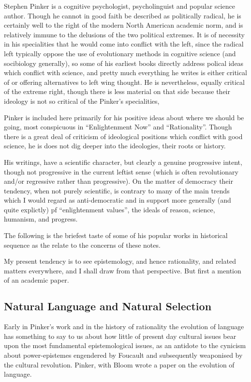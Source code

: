 \documentclass[10pt,titlepage]{book}
\begin{document}
Stephen Pinker is a cognitive psychologist, psycholinguist and popular science author.
Though he cannot in good faith be described as politically radical, he is certainly well to the right of the modern North American academic norm, and is relatively immune to the delusions of the two political extremes.
It is of necessity in his specialities that he would come into conflict with the left, since the radical left typically oppose the use of evolutionary methods in cognitive science (and socibiology generally), so some of his earliest books directly address polical ideas which conflict with science, and pretty much everything he writes is either critical of or offering alternatives to left wing thought.
He is nevertheless, equally critical of the extreme right, though there is less material on that side because their ideology is not so critical of the Pinker's specialities,

Pinker is included here primarily for his positive ideas about where we should be going, most conspicuous in ``Enlightenment Now'' and ``Rationality''.
Though there is a great deal of criticism of ideological positions which conflict with good science, he is does not dig deeper into the ideologies, their roots or history.

His writings, have a scientific character, but clearly a genuine progressive intent, though not progressive in the current leftist sense (which is often revolutionary and/or regressive rather than progressive).
On the matter of democracy their tendency, when not purely scientific, is contrary to  many of the main trends which I would regard as anti-democratic and in support more generally (and quite explictly) pf ``enlightenment values'', the ideals of reason, science, humanism, and progress.

The following is the briefest taste of some of his popular works in historical sequence as the relate to the concerns of these notes.

My present tendency is to see epistemology, and hence rationality, and related matters everywhere, and I shall draw from that perspective.
But first a mention of an academic paper.

\subsection{Natural Language and Natural Selection \cite{pinker-nlns}}

Early in Pinker's work and in the history of rationality the evolution of language has something to say to us about how little of present day cultural issues bear upon the most fundamental epistemological issues, as an antidote to the cynicism about power-epistemes engendered by Foucault and subsequently weaponised by the cultural revolution.
Pinker, with Bloom wrote a paper on the evolution of language.
\end{document}

